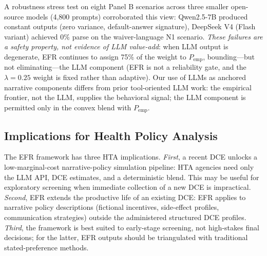 \documentclass[11pt]{article}
\begin{document}
A robustness stress test on eight Panel B scenarios across three smaller open-source models (4,800 prompts) corroborated this view: Qwen2.5-7B produced constant outputs (zero variance, default-answer signature), DeepSeek V4 (Flash variant) achieved 0\% parse on the waiver-language N1 scenario. \emph{These failures are a safety property, not evidence of LLM value-add}: when LLM output is degenerate, EFR continues to assign 75\% of the weight to $P_{\text{emp}}$, bounding---but not eliminating---the LLM component (EFR is not a reliability gate, and the $\lambda=0.25$ weight is fixed rather than adaptive). Our use of LLMs as anchored narrative components differs from prior tool-oriented LLM work: the empirical frontier, not the LLM, supplies the behavioral signal; the LLM component is permitted only in the convex blend with $P_{\text{emp}}$.

\subsection{Implications for Health Policy Analysis}
\label{sec:impl_policy}

The EFR framework has three HTA implications. \emph{First}, a recent DCE unlocks a low-marginal-cost narrative-policy simulation pipeline: HTA agencies need only the LLM API, DCE estimates, and a deterministic blend. This may be useful for exploratory screening when immediate collection of a new DCE is impractical. \emph{Second}, EFR extends the productive life of an existing DCE: EFR applies to narrative policy descriptions (fictional incentives, side-effect profiles, communication strategies) outside the administered structured DCE profiles. \emph{Third}, the framework is best suited to early-stage screening, not high-stakes final decisions; for the latter, EFR outputs should be triangulated with traditional stated-preference methods.
\end{document}
